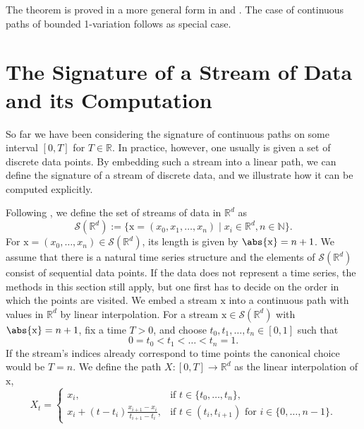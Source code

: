 \documentclass[
    a4paper,
    11pt,
    bibliography=totoc,
    listof=totoc,      
    headinclude=true,
    cleardoublepage=empty,
]{scrbook}
\theoremstyle{plain}
\theoremstyle{definition}
\theoremstyle{remark}
\newcommand{\SetR}{\mathbb R}
\newcommand{\SetN}{\mathbb N}
\begin{document}
The theorem is proved in a more general form in \cite{kalsi2020_oewrps} and 
\cite{bayer2021_osws}. The case of continuous paths of bounded
1-variation follows as special case.
    
\section{The Signature of a Stream of Data and its Computation} 
\label{chapter:Signature:section:StreamComputation}

So far we have been considering the signature of continuous paths on some
interval $[0,T]$ for $T\in\SetR$. In practice, however, one usually is given a
set of discrete data points. By embedding such a stream into a linear path, we
can define the signature of a stream of discrete data, and we illustrate
how it can be computed explicitly.

Following \cite{bonnier2019_dst}, we define the set of streams of data in 
$\SetR^d$ as
\[
    \mathcal{S}(\SetR^d) 
    := \{\mathrm x= (x_0, x_1, \dots, x_n) \mid x_i \in \SetR^d, n\in\SetN\}.
\]
For $\mathrm x = (x_0,\dots,x_n)\in\mathcal{S}(\SetR^d)$, its length is given 
by $\abs{\mathrm x} = n+1$. We assume that there is a natural time series 
structure and the elements of $\mathcal{S}(\SetR^d)$ consist of sequential 
data points. If the data does not represent a time series, the methods in this 
section still apply, but one first has to decide on the order in 
which the points are visited. We embed a stream $\mathrm x$ into a continuous 
path with values in $\SetR^d$ by linear interpolation. For a stream $\mathrm x 
\in \mathcal{S}(\SetR^d)$ with $\abs{\mathrm x}=n+1$, fix a time $T>0$, and 
choose $t_0, t_1, \dots, t_n \in[0,1]$ such that
\[
    0=t_0 < t_1 < \dots < t_n = 1.
\]
If the stream's indices already correspond to time points the canonical choice 
would be $T=n$. We define the path $X:[0,T]\to\SetR^d$ as the linear 
interpolation of 
$\mathrm x$,
\[
    X_t = \begin{cases}
        x_i, & \text{if } t\in\{t_0, \dots, t_n\}, \\
        x_{i} + (t-t_i) \displaystyle \frac{x_{i+1} - x_i}{t_{i+1}-t_i}, &
            \text{if } t\in (t_i, t_{i+1}) \text{ for } i\in \{0,\dots,n-1\}.
    \end{cases}
\]
\end{document}
